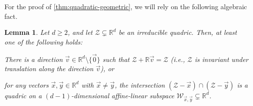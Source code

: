 \documentclass[english]{article}
\newtheorem{lemma}[theorem]{Lemma}
\theoremstyle{remark}
\numberwithin{equation}{section}
\numberwithin{figure}{section}
\newcommand{\RR}{\mathbb{R}}
\begin{document}
For the proof of \cref{thm:quadratic-geometric}, we will rely on the following
algebraic fact. 
\begin{lemma}
\label{lem:geometry-lemma}Let $d\ge 2$, and let $\mathcal{Z}\subsetneq\mathbb{R}^{d}$ be an irreducible quadric. Then, at least one of the following holds: 
\begin{compactitem}
\item[(i)] There is a direction $\vec{v}\in \RR^d\setminus\{\vec 0\}$ such that $\mathcal{Z}+\mathbb{R}\vec{v}=\mathcal{Z}$
(i.e., $\mathcal{Z}$ is invariant under translation along the direction
$\vec{v}$), or 
\item [(ii)] for any vectors $\vec{x},\vec{y}\in \RR^d$ with $\vec{x}\ne\vec{y}$, the intersection $(\mathcal{Z}-\vec{x})\cap(\mathcal{Z}-\vec{y})$
is a quadric on a $(d-1)$-dimensional affine-linear subspace $\mathcal{W}_{\vec{x},\vec{y}}\subsetneq\mathbb{R}^{d}$.
\end{compactitem}
\end{lemma}
\end{document}
